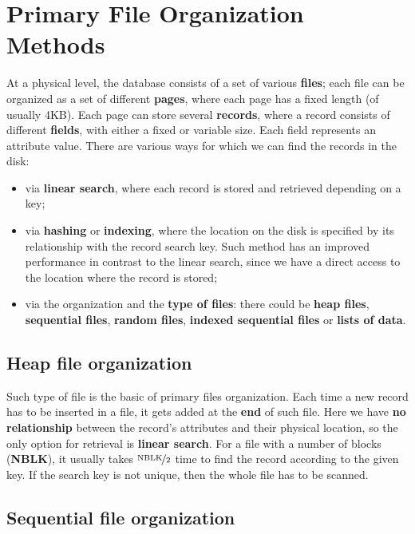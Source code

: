 \section{Primary File Organization Methods}

At a physical level, the database consists of a set of various \textbf{files}; each file can be organized as a set of different \textbf{pages}, where each page has a fixed length (of usually 4KB). Each page can store several \textbf{records}, where a record consists of different \textbf{fields}, with either a fixed or variable size. Each field represents an attribute value. There are various ways for which we can find the records in the disk:
\begin{itemize}
    \item via \textbf{linear search}, where each record is stored and retrieved depending on a key;
    \item via \textbf{hashing} or \textbf{indexing}, where the location on the disk is specified by its relationship with the record search key. Such method has an improved performance in contrast to the linear search, since we have a direct access to the location where the record is stored;
    \item via the organization and the \textbf{type of files}: there could be \textbf{heap files}, \textbf{sequential files}, \textbf{random files}, \textbf{indexed sequential files} or \textbf{lists of data}.
\end{itemize}

\subsection{Heap file organization}

Such type of file is the basic of primary files organization. Each time a new record has to be inserted in a file, it gets added at the \textbf{end} of such file. Here we have \textbf{no relationship} between the record's attributes and their physical location, so the only option for retrieval is \textbf{linear search}. For a file with a number of blocks (\textbf{NBLK}), it usually takes $\nicefrac{\text{NBLK}}{2}$ time to find the record according to the given key. If the search key is not unique, then the whole file has to be scanned.

\subsection{Sequential file organization}

